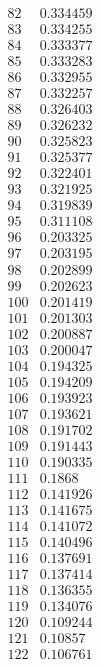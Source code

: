 \documentclass[12pt]{article}
\begin{document}
{$$\begin{array}{|r|r|}
\hline
82 & 0.334459\\
\hline
83 & 0.334255\\
\hline
84 & 0.333377\\
\hline
85 & 0.333283\\
\hline
86 & 0.332955\\
\hline
87 & 0.332257\\
\hline
88 & 0.326403\\
\hline
89 & 0.326232\\
\hline
90 & 0.325823\\
\hline
91 & 0.325377\\
\hline
92 & 0.322401\\
\hline
93 & 0.321925\\
\hline
94 & 0.319839\\
\hline
95 & 0.311108\\
\hline
96 & 0.203325\\
\hline
97 & 0.203195\\
\hline
98 & 0.202899\\
\hline
99 & 0.202623\\
\hline
100 & 0.201419\\
\hline
101 & 0.201303\\
\hline
102 & 0.200887\\
\hline
103 & 0.200047\\
\hline
104 & 0.194325\\
\hline
105 & 0.194209\\
\hline
106 & 0.193923\\
\hline
107 & 0.193621\\
\hline
108 & 0.191702\\
\hline
109 & 0.191443\\
\hline
110 & 0.190335\\
\hline
111 & 0.1868\\
\hline
112 & 0.141926\\
\hline
113 & 0.141675\\
\hline
114 & 0.141072\\
\hline
115 & 0.140496\\
\hline
116 & 0.137691\\
\hline
117 & 0.137414\\
\hline
118 & 0.136355\\
\hline
119 & 0.134076\\
\hline
120 & 0.109244\\
\hline
121 & 0.10857\\
\hline
122 & 0.106761\\

\end{array}$$}
\end{document}
